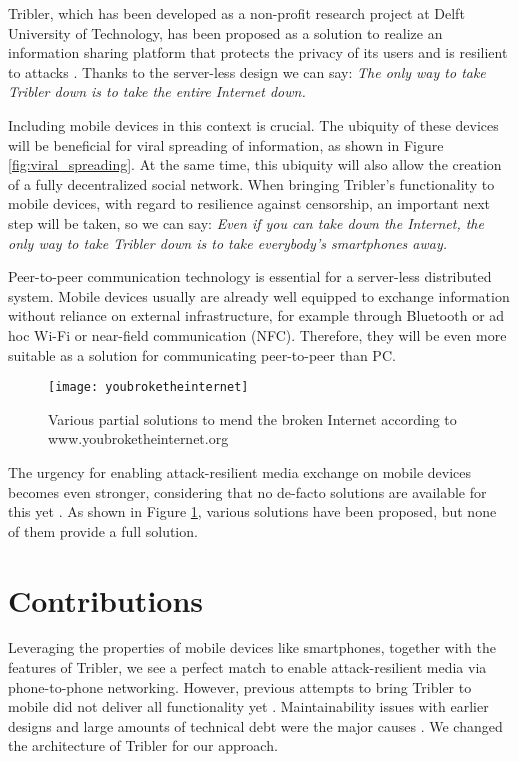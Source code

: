 Tribler, which has been developed as a non-profit research project at Delft University of Technology, has been proposed as a solution to realize an information sharing platform that protects the privacy of its users and is resilient to attacks \cite{tor_bittorrent}.
Thanks to the server-less design we can say: \emph{The only way to take Tribler down is to take the entire Internet down.}

Including mobile devices in this context is crucial.
The ubiquity of these devices will be beneficial for viral spreading of information, as shown in Figure \ref{fig:viral_spreading}.
At the same time, this ubiquity will also allow the creation of a fully decentralized social network.
When bringing Tribler's functionality to mobile devices, with regard to resilience against censorship, an important next step will be taken, so we can say: \emph{Even if you can take down the Internet, the only way to take Tribler down is to take everybody's smartphones away.}

Peer-to-peer communication technology is essential for a server-less distributed system.
Mobile devices usually are already well equipped to exchange information without reliance on external infrastructure, for example through Bluetooth or ad hoc Wi-Fi or near-field communication (NFC).
Therefore, they will be even more suitable as a solution for communicating peer-to-peer than PC.

\begin{figure}
	\centering
	\texttt{[image: youbroketheinternet]}
	\caption{Various partial solutions to mend the broken Internet according to www.youbroketheinternet.org}
	\label{fig:youbroketheinternet}
\end{figure}

The urgency for enabling attack-resilient media exchange on mobile devices becomes even stronger, considering that no de-facto solutions are available for this yet \cite{redecentralize2015alternativeinternet, survey_brussee}.
As shown in Figure \ref{fig:youbroketheinternet}, various solutions have been proposed, but none of them provide a full solution.


\section{Contributions}
Leveraging the properties of mobile devices like smartphones, together with the features of Tribler, we see a perfect match to enable attack-resilient media via phone-to-phone networking.
However, previous attempts to bring Tribler to mobile did not deliver all functionality yet \cite{tribler2014play,tribler2014at3,tribler-anon-hd}.
Maintainability issues with earlier designs and large amounts of technical debt were the major causes \cite{thesis_martijn}.
We changed the architecture of Tribler for our approach.

